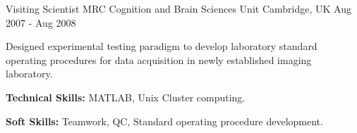 \begin{cventries}
  \cventry
  {Visiting Scientist} %
  {MRC Cognition and Brain Sciences Unit} %
  {Cambridge, UK} %
  {Aug 2007 - Aug 2008} %
  {
    \begin{cvitems} %
      \item {Designed experimental testing paradigm to develop laboratory standard operating procedures for data acquisition in newly established imaging laboratory.}
      \item {\textbf{Technical Skills:} MATLAB, Unix Cluster computing.}
      \item {\textbf{Soft Skills:} Teamwork, QC, Standard operating procedure development.}
    \end{cvitems}
  }

\end{cventries}
